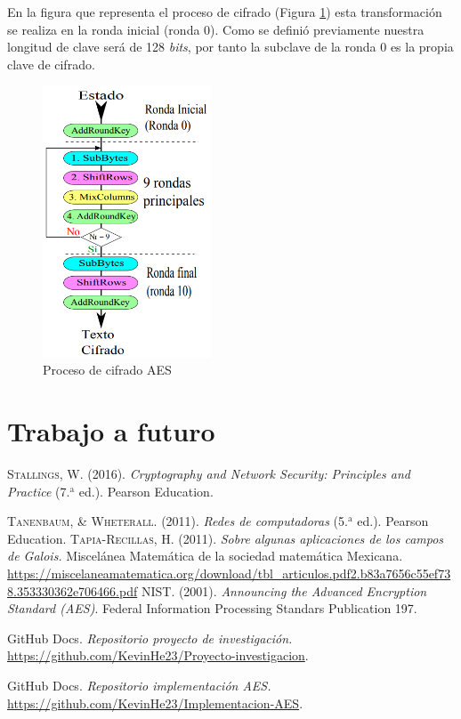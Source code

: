 \documentclass[peerreview]{IEEEtran}
\begin{document}
En la figura que representa el proceso de cifrado (Figura \ref{fig: 7}) esta transformación se realiza en la ronda inicial (ronda 0). Como se definió previamente nuestra longitud de clave será de 128 \textit{bits}, por tanto la subclave de la ronda 0 es la propia clave de cifrado.
\begin{figure}[H]
\includegraphics[width=5cm]{figuras/Diagrama1.png}
\centering
\caption{Proceso de cifrado AES}
\label{fig: 7}
\end{figure}
 


\section{Trabajo a futuro}

\begin{thebibliography}{1}
 \textsc{Stallings, W.} (2016). \textit{Cryptography and Network Security: Principles and Practice} (7.$^{\text{a}}$ ed.). Pearson Education.

 \textsc{Tanenbaum, \& Wheterall.} (2011). \textit{Redes de computadoras} (5.$^{\text{a}}$ ed.). Pearson Education.
\textsc{Tapia-Recillas, H.} (2011). \textit{Sobre algunas aplicaciones de los campos de Galois.} Miscelánea Matemática de la sociedad matemática Mexicana. \url{https://miscelaneamatematica.org/download/tbl_articulos.pdf2.b83a7656c55ef738.353330362e706466.pdf}
 \textsc{NIST}. (2001). \textit{Announcing the Advanced Encryption Standard (AES)}. Federal Information Processing Standars Publication 197.

 GitHub Docs.\textit{ Repositorio proyecto de investigación.} \url{https://github.com/KevinHe23/Proyecto-investigacion}.

 GitHub Docs.\textit{ Repositorio implementación AES.} \url{https://github.com/KevinHe23/Implementacion-AES}.
\end{thebibliography}
\end{document}
